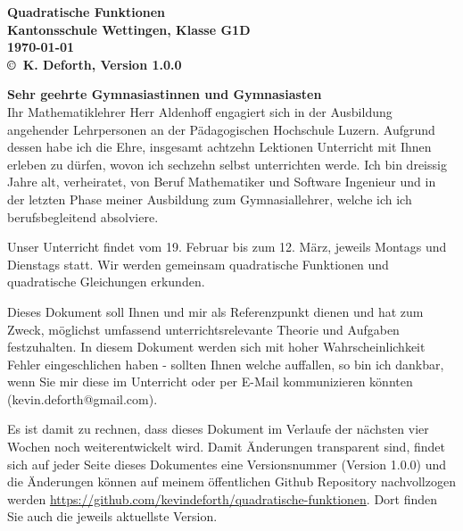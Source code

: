 \documentclass[12pt]{article}
\newcommand{\docName}{Quadratische Funktionen}
\newcommand{\docVersion}{Version 1.0.0}
\newcommand{\klasse}{Kantonsschule Wettingen, Klasse G1D}
\begin{document}
\begingroup %
\centering %
\LARGE\bfseries %
\docName{} \\[1em] %
\normalsize
\klasse \\[0.5em]
\today\\[0.5em]
\mdseries\normalsize
\copyright~K. Deforth, \docVersion{}\\[2em] %
\endgroup

\thispagestyle{empty}

\noindent%
\textbf{Sehr geehrte Gymnasiastinnen und Gymnasiasten}\\

Ihr Mathematiklehrer Herr Aldenhoff engagiert sich in der Ausbildung angehender Lehrpersonen an der Pädagogischen Hochschule Luzern. Aufgrund dessen habe ich die Ehre, insgesamt achtzehn Lektionen Unterricht mit Ihnen erleben zu dürfen, wovon ich sechzehn selbst unterrichten werde. Ich bin dreissig Jahre alt, verheiratet, von Beruf Mathematiker und Software Ingenieur und in der letzten Phase meiner Ausbildung zum Gymnasiallehrer, welche ich ich berufsbegleitend absolviere.

Unser Unterricht findet vom 19. Februar bis zum 12. März, jeweils Montags und Dienstags statt. Wir werden gemeinsam quadratische Funktionen und quadratische Gleichungen erkunden.

Dieses Dokument soll Ihnen und mir als Referenzpunkt dienen und hat zum Zweck, möglichst umfassend unterrichtsrelevante Theorie und Aufgaben festzuhalten. In diesem Dokument werden sich mit hoher Wahrscheinlichkeit Fehler eingeschlichen haben - sollten Ihnen welche auffallen, so bin ich dankbar, wenn Sie mir diese im Unterricht oder per E-Mail kommunizieren könnten ({kevin.deforth@gmail.com}). 

Es ist damit zu rechnen, dass dieses Dokument im Verlaufe der nächsten vier Wochen noch weiterentwickelt wird. Damit Änderungen transparent sind, findet sich auf jeder Seite dieses Dokumentes eine Versionsnummer (\docVersion) und die Änderungen können auf meinem öffentlichen Github Repository nachvollzogen werden \href{https://github.com/kevindeforth/quadratische-funktionen}{https://github.com/kevindeforth/quadratische-funktionen}. Dort finden Sie auch die jeweils aktuellste Version.
\end{document}
